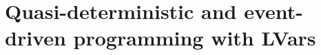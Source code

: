 \chapter{Quasi-deterministic and event-driven programming with LVars}\label{ch:quasi} %

\ifdefined\JOURNAL
{}
\fi

\ifdefined\DISSERTATION







\fi
